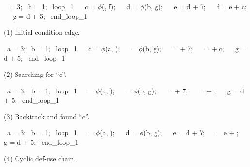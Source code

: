 \documentclass{article}
\newcommand{\PHI}{\ensuremath{\phi}}
\begin{document}
\begin{center}
\begin{minipage}{3cm}
  \begin{fprog}
~ = 3;
~b = 1;
~loop\_1
~~ c = \PHI(, f);
~~ d = \PHI(b, g);
~~ e = d + 7;
~~ f = e + c;
~~ g = d + 5;
~end\_loop\_1
  \end{fprog}

    \smallskip
    \tiny
    (1) Initial condition edge.
  \end{minipage}
  \begin{minipage}{3cm}
    \begin{fprog}
~a = 3;
~b = 1;
~loop\_1
~~ c = \PHI(a, );
~~  = \PHI(b, g);
~~  =  + 7;
~~  =  + c;
~~ g = d + 5;
~end\_loop\_1
    \end{fprog}

    \smallskip
    \tiny
    (2) Searching for ``c''.
  \end{minipage}
  \begin{minipage}{3cm}
    \begin{fprog}
~a = 3;
~b = 1;
~loop\_1
~~  = \PHI(a, );
~~  = \PHI(b, g);
~~  =  + 7;
~~  =  + ;
~~ g = d + 5;
~end\_loop\_1
    \end{fprog}

    \smallskip
    \tiny
    (3) Backtrack and found ``c''.
  \end{minipage}
  \begin{minipage}{3cm}
    \begin{fprog}
~a = 3;
~b = 1;
~loop\_1
~~  = \PHI(a, );
~~ d = \PHI(b, g);
~~ e = d + 7;
~~  = e + ;
~~ g = d + 5;
~end\_loop\_1
    \end{fprog}

    \smallskip
    \tiny
    (4) Cyclic def-use chain.
  \end{minipage}
\end{center}
\end{document}
